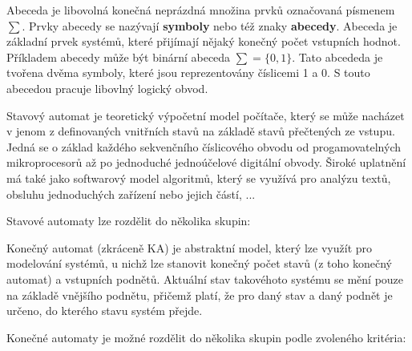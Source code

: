 


%

%
%


Abeceda je libovolná konečná neprázdná množina prvků označovaná písmenem $\sum$. Prvky abecedy se nazývají {\bf symboly} nebo též znaky {\bf abecedy}. Abeceda je základní prvek systémů, které přijímají nějaký konečný počet vstupních hodnot. Příkladem abecedy může být binární abeceda $\sum = \{0, 1\}$. Tato abcededa je tvořena dvěma symboly, které jsou reprezentovány číslicemi 1 a 0. S touto abecedou pracuje libovlný logický obvod.





Stavový automat je teoretický výpočetní model počítače, který se může nacházet v jenom z definovaných vnitřních stavů na základě stavů přečtených ze vstupu. Jedná se o základ každého sekvenčního číslicového obvodu od progamovatelných mikroprocesorů až po jednoduché jednoúčelové digitální obvody. Široké uplatnění má také jako softwarový model algoritmů, který se využívá pro analýzu textů, obsluhu jednoduchých zařízení nebo jejich částí, ...

Stavové automaty lze rozdělit do několika skupin:






Konečný automat (zkráceně KA) je abstraktní model, který lze využít pro modelování systémů, u nichž lze stanovit konečný počet stavů (z toho konečný automat) a vstupních podnětů. Aktuální stav takovéhoto systému se mění pouze na základě vnějšího podnětu, přičemž platí, že pro daný stav a daný podnět je určeno, do kterého stavu systém přejde.

Konečné automaty je možné rozdělit do několika skupin podle zvoleného kritéria:



